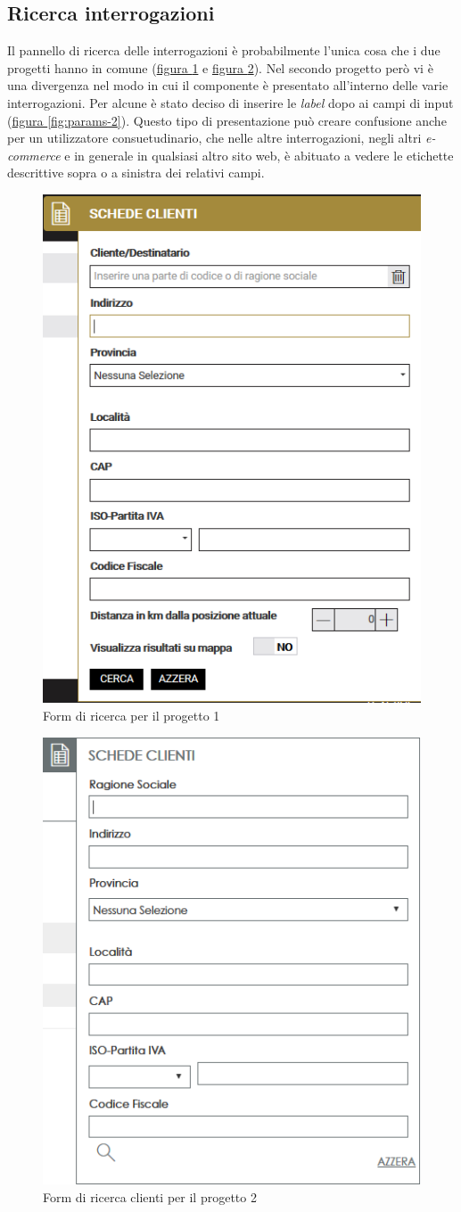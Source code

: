 \subsection{Ricerca interrogazioni}
Il pannello di ricerca delle interrogazioni è probabilmente l'unica cosa che i due progetti hanno in comune (\hyperref[fig:params-1]{figura \ref{fig:params-1}} e \hyperref[fig:clienti-params-2]{figura \ref{fig:clienti-params-2}}). Nel secondo progetto però vi è una divergenza nel modo in cui il componente è presentato all'interno delle varie interrogazioni. Per alcune è stato deciso di inserire le \textit{label} dopo ai campi di input (\hyperref[fig:params-2]{figura \ref{fig:params-2}}). Questo tipo di presentazione può creare confusione anche per un utilizzatore consuetudinario, che nelle altre interrogazioni, negli altri \textit{e-commerce} e in generale in qualsiasi altro sito web, è abituato a vedere le etichette descrittive sopra o a sinistra dei relativi campi.
\begin{figure}[H]
	\centering
	\includegraphics[height=0.8\linewidth]{Immagini/p1/params.png}
	\caption{Form di ricerca per il progetto 1}
	\label{fig:params-1}
\end{figure}
\begin{figure}[H]
	\centering
	\includegraphics[height=0.7\linewidth]{Immagini/p2/clienti-params.png}
	\caption{Form di ricerca clienti per il progetto 2}
	\label{fig:clienti-params-2}
\end{figure}
